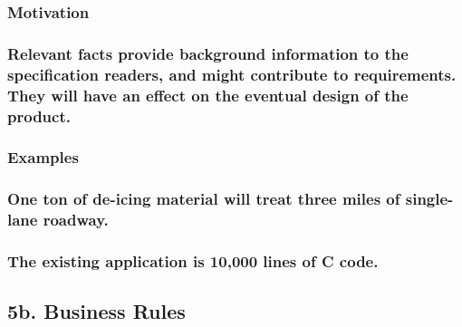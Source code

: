 \documentclass[
]{article}
\begin{document}
\hypertarget{motivation-19}{%
\subsubsection{Motivation}\label{motivation-19}}

\hypertarget{relevant-facts-provide-background-information-to-the-specification-readers-and-might-contribute-to-requirements.-they-will-have-an-effect-on-the-eventual-design-of-the-product.}{%
\subsubsection{\texorpdfstring{Relevant facts provide background
information to the specification readers, and might contribute to
requirements. They will have an effect on the eventual design of the
product.
}{Relevant facts provide background information to the specification readers, and might contribute to requirements. They will have an effect on the eventual design of the product. }}\label{relevant-facts-provide-background-information-to-the-specification-readers-and-might-contribute-to-requirements.-they-will-have-an-effect-on-the-eventual-design-of-the-product.}}

\hypertarget{examples-9}{%
\subsubsection{\texorpdfstring{Examples }{Examples }}\label{examples-9}}

\hypertarget{one-ton-of-de-icing-material-will-treat-three-miles-of-single-lane-roadway.}{%
\subsubsection{One ton of de-icing material will treat three miles of
single-lane
roadway.}\label{one-ton-of-de-icing-material-will-treat-three-miles-of-single-lane-roadway.}}

\hypertarget{the-existing-application-is-10000-lines-of-c-code.}{%
\subsubsection{The existing application is 10,000 lines of C
code.}\label{the-existing-application-is-10000-lines-of-c-code.}}

\hypertarget{b.-business-rules}{%
\subsection{5b. Business Rules}\label{b.-business-rules}}
\end{document}
